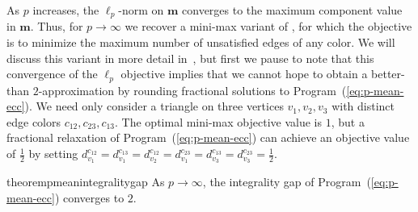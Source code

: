 As $p$ increases, the $\ell_p$-norm on $\textbf{m}$ converges to the maximum component value in $\textbf{m}$. 
Thus, for $p \rightarrow \infty$ we recover a mini-max variant of \ECC{}, for which the objective is to minimize the maximum number of unsatisfied edges of any color.
We will discuss this variant in more detail in~, but first we pause to note that this convergence of the $\ell_p$ objective
implies that we cannot hope to obtain a better-than $2$-approximation by rounding fractional solutions to Program~(\ref{eq:p-mean-ecc}).
We need only consider a triangle on three vertices $v_1, v_2, v_3$ with distinct edge colors $c_{12}, c_{23}, c_{13}$. The optimal mini-max objective value is $1$, but
a fractional relaxation of Program~(\ref{eq:p-mean-ecc})
can achieve an objective value of $\frac{1}{2}$ by setting $d_{v_1}^{c_{12}} = d_{v_1}^{c_{13}} = d_{v_2}^{c_{12}} = d_{v_1}^{c_{23}} = d_{v_3}^{c_{13}} = d_{v_3}^{c_{23}} = \frac{1}{2}$.

\begin{restatable}{theorem}{pmeanintegralitygap}
    As $p \rightarrow \infty$, the integrality gap of Program~(\ref{eq:p-mean-ecc}) converges to $2$. 
\end{restatable}
